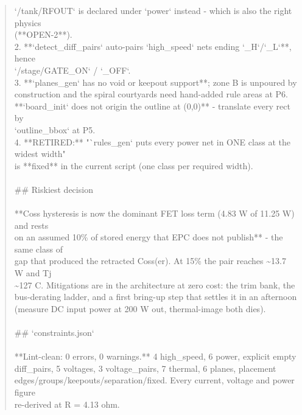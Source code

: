 \documentclass[11pt,a4paper]{article}
\begin{document}
\begin{quote}
   `/tank/RFOUT` is declared under `power` instead - which is also the right physics\\
   ({*}{*}OPEN-2{*}{*}).\\
2. {*}{*}`detect\_diff\_pairs` auto-pairs `high\_speed` nets ending `\_H`/`\_L`{*}{*}, hence\\
   `/stage/GATE\_ON` / `\_OFF`.\\
3. {*}{*}`planes\_gen` has no void or keepout support{*}{*}; zone B is unpoured by\\
   construction and the spiral courtyards need hand-added rule areas at P6.\\
   {*}{*}`board\_init` does not origin the outline at (0,0){*}{*} - translate every rect by\\
   `outline\_bbox` at P5.\\
4. {*}{*}RETIRED:{*}{*} "`rules\_gen` puts every power net in ONE class at the widest width"\\
   is {*}{*}fixed{*}{*} in the current script (one class per required width).\\
~\\
\#\# Riskiest decision\\
~\\
{*}{*}Coss hysteresis is now the dominant FET loss term (4.83 W of 11.25 W) and rests\\
on an assumed 10\% of stored energy that EPC does not publish{*}{*} - the same class of\\
gap that produced the retracted Coss(er). At 15\% the pair reaches \textasciitilde{}13.7 W and Tj\\
\textasciitilde{}127 C. Mitigations are in the architecture at zero cost: the trim bank, the\\
bus-derating ladder, and a first bring-up step that settles it in an afternoon\\
(measure DC input power at 200 W out, thermal-image both dies).\\
~\\
\#\# `constraints.json`\\
~\\
{*}{*}Lint-clean: 0 errors, 0 warnings.{*}{*} 4 high\_speed, 6 power, explicit empty\\
diff\_pairs, 5 voltages, 3 voltage\_pairs, 7 thermal, 6 planes, placement\\
edges/groups/keepouts/separation/fixed. Every current, voltage and power figure\\
re-derived at R = 4.13 ohm.\\

\end{quote}
\end{document}
